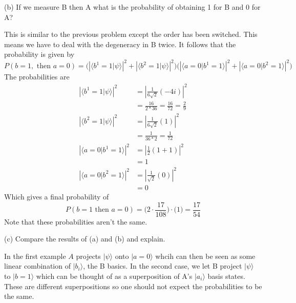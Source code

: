 \documentclass[a4paper, 11pt]{article}
\newcommand{\ket}[1]{|#1\rangle}
\newcommand{\braket}[2]{\langle #1 | #2 \rangle}
\newenvironment{solution}{%
	\begin{list}{}{%
			\setlength{\topsep}{0pt}%
			\setlength{\leftmargin}{1.5cm}%
			\setlength{\rightmargin}{1.5cm}%
			\setlength{\listparindent}{\parindent}%
			\setlength{\itemindent}{\parindent}%
			\setlength{\parsep}{\parskip}%
		}%
		\item[]}{\end{list}}
\begin{document}
\noindent(b) If we measure B then A what is the probability of obtaining 1 for B and 0 for A? \\
	\begin{solution}
		\noindent This is similar to the previous problem except the order has been switched. This means we have to deal with the degeneracy in B twice. It follows that the probability is given by 	
			\begin{equation*}
					P(b=1, \text{ then } a=0) = \Bigg(\left|\braket{b^1=1}{\psi}\right|^2 +\left|\braket{b^2=1}{\psi}\right|^2\Bigg)\Bigg( \left|\braket{a=0}{b^1=1}\right|^2+\left|\braket{a=0}{b^2=1}\right|^2 \Bigg)
			\end{equation*}
		The probabilities are 
			\begin{align*}
				\left|\braket{b^1=1}{\psi}\right|^2 &= \left| \frac{1}{6\sqrt{2}}(-4i) \right|^2 \\ 
					&= \frac{16}{2*36} = \frac{16}{72} = \frac{2}{9} \\
				\left|\braket{b^2=1}{\psi}\right|^2 &= \left|  \frac{1}{6\sqrt{2}}(1)\right|^2 \\
					&= \frac{1}{36*2}=\frac{1}{72} \\
				\left|\braket{a=0}{b^1=1}\right|^2 &= \left|  \frac{1}{2}(1+1)\right|^2 \\
					&= 1 \\
				\left|\braket{a=0}{b^2=1}\right|^2 &= \left|\frac{1}{\sqrt{2}}(0)\right|^2 \\
					&= 0
			\end{align*}
		Which gives a final probability of 
			\begin{equation*}
				P(b=1 \text{ then } a=0) = \Big(2\cdot\frac{17}{108}\Big)\cdot \Big(1\Big) = \frac{17}{54}
			\end{equation*}
		Note that these probabilities aren't the same. \\
	\end{solution}

\noindent (c) Compare the results of (a) and (b) and explain. \\
	\begin{solution}
		\noindent In the first example $A$ projects $\ket{\psi}$ onto $\ket{a=0}$ whcih can then be seen as some linear combination of $\ket{b_i}$, the B basics. In the second case, we let B project $\ket{\psi}$ to $\ket{b=1}$ which can be thought of as a superposition of A's $\ket{a_i}$ basis states. These are different superpositions so one should not expect the probabilities to be the same. \\
	\end{solution}
\end{document}
